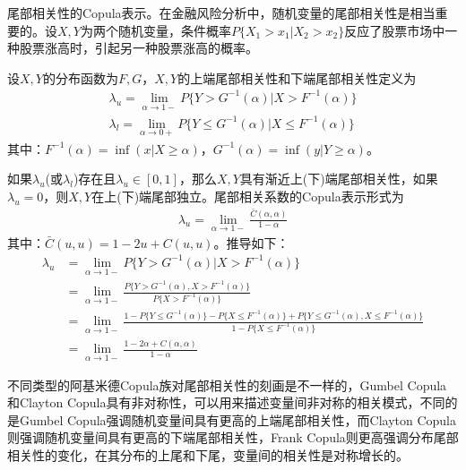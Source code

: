             \par
            尾部相关性的Copula表示。在金融风险分析中，随机变量的尾部相关性是相当重要的。设$X,Y$为两个随机变量，条件概率$P\{X_1>x_1|X_2>x_2\}$反应了股票市场中一种股票涨高时，引起另一种股票涨高的概率。
            \begin{definition}[尾部相关性]
            设$X,Y$的分布函数为$F,G$，$X,Y$的上端尾部相关性和下端尾部相关性定义为
            \begin{align*}
            \lambda_u = \lim_{\alpha\rightarrow 1-}P\{Y>G^{-1}(\alpha)|X>F^{-1}(\alpha )\}\\
            \lambda_l = \lim_{\alpha\rightarrow 0+}P\{Y \leqslant G^{-1}(\alpha)|X \leqslant F^{-1}(\alpha )\}
            \end{align*}
            其中：$F^{-1}(\alpha) = \inf(x|X \geqslant \alpha)$，$G^{-1}(\alpha) = \inf(y|Y \geqslant \alpha)$。
            \end{definition}
            \par
            如果$\lambda_u$(或$\lambda_l$)存在且$\lambda_u \in [0,1]$，那么$X,Y$具有渐近上(下)端尾部相关性，如果$\lambda _u = 0$，则$X,Y$在上(下)端尾部独立。尾部相关系数的Copula表示形式为
            \begin{align*}
            \lambda _u = \lim_{\alpha\rightarrow1-}\frac{\bar{C}(\alpha,\alpha)}{1-\alpha}
            \end{align*}
            其中：$\bar{C}(u,u) = 1-2u+C(u,u)$。推导如下：
            \begin{align*}
            \lambda_u &= \lim_{\alpha\rightarrow 1-}P\{Y>G^{-1}(\alpha)|X>F^{-1}(\alpha )\}\\
            &= \lim _{\alpha\rightarrow 1-} \frac{P\{Y>G^{-1}(\alpha),X>F^{-1}(\alpha)\}}{P\{X>F^{-1}(\alpha)\}}\\
            &=\lim _{\alpha\rightarrow 1-}\frac{1-P\{Y \leqslant G^{-1}(\alpha)\} - P\{X \leqslant F^{-1}(\alpha) \} + P\{Y \leqslant G^{-1}(\alpha),X \leqslant F^{-1}(\alpha) \}  }{1 - P\{X \leqslant F^{-1}(\alpha) \} }\\
            &=\lim _{\alpha\rightarrow 1-}\frac{1-2\alpha+C(\alpha,\alpha)}{1-\alpha}
            \end{align*}
            \par
            不同类型的阿基米德Copula族对尾部相关性的刻画是不一样的，Gumbel Copula和Clayton Copula具有非对称性，可以用来描述变量间非对称的相关模式，不同的是Gumbel Copula强调随机变量间具有更高的上端尾部相关性，而Clayton Copula则强调随机变量间具有更高的下端尾部相关性，Frank Copula则更高强调分布尾部相关性的变化，在其分布的上尾和下尾，变量间的相关性是对称增长的。

